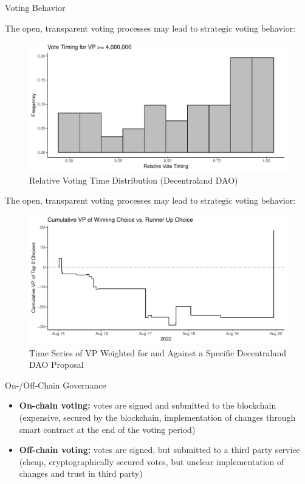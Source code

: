 \documentclass[]{beamer}
\begin{document}
\begin{frame}[allowframebreaks]{Voting Behavior}
	\framebreak
	
	The open, transparent voting processes may lead to strategic voting behavior:

	\begin{figure}
		\center
		\includegraphics[width=\textwidth]{../assets/figures/governanceHist6.pdf}
		\caption{Relative Voting Time Distribution (Decentraland DAO) \cite{goldbergMetaverse2023}}
	\end{figure}

	\framebreak
	
	The open, transparent voting processes may lead to strategic voting behavior:

	\begin{figure}
		\center
		\includegraphics[width=\textwidth]{../assets/figures/lastMinuteSwing.pdf}
		\caption{Time Series of VP Weighted for and Against a Specific Decentraland DAO Proposal \cite{goldbergMetaverse2023}}
	\end{figure}
	
\end{frame}

\begin{frame}{On-/Off-Chain Governance}
	\begin{itemize}
		\item \textbf{On-chain voting:} votes are signed and submitted to the blockchain (expensive, secured by the blockchain, implementation of changes through smart contract at the end of the voting period)
		\item \textbf{Off-chain voting:} votes are signed, but submitted to a third party service (cheap, cryptographically secured votes, but unclear implementation of changes and trust in third party)
	\end{itemize}
\end{frame}
\end{document}
